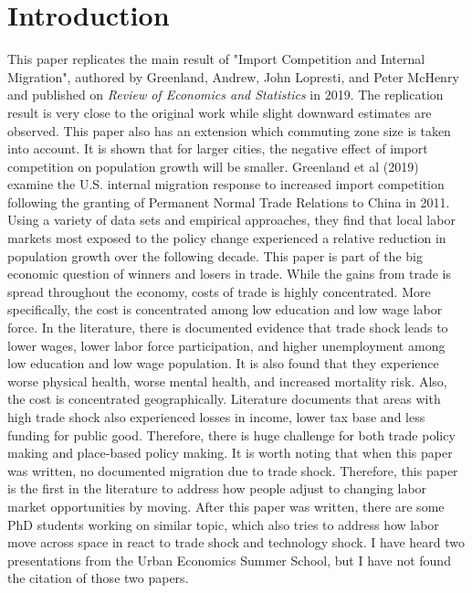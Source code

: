 \documentclass[12pt, final]{CSP}
\begin{document}
\section{Introduction}
\label{}
\noindent
This paper replicates the main result of "Import Competition and Internal Migration"\cite{greenland2019import}, authored by Greenland, Andrew, John Lopresti, and Peter McHenry and published on \textit{Review of Economics and Statistics} in 2019. The replication result is very close to the original work while slight downward estimates are observed. This paper also has an extension which commuting zone size is taken into account. It is shown that for larger cities, the negative effect of import competition on population growth will be smaller. 
\newline
\newline
Greenland et al (2019)\cite{greenland2019import} examine the U.S. internal migration response to increased import competition following the granting of Permanent Normal Trade Relations to China in 2011. Using a variety of data sets and empirical approaches, they find that local labor markets most exposed to the policy change experienced a relative reduction in population growth over the following decade.
\newline
\newline
This paper is part of the big economic question of winners and losers in trade. While the gains from trade is spread throughout the economy, costs of trade is highly concentrated. More specifically, the cost is concentrated among low education and low wage labor force. In the literature, there is documented evidence that trade shock leads to lower wages, lower labor force participation, and higher unemployment among low education and low wage population. It is also found that they experience worse physical health, worse mental health, and increased mortality risk. Also, the cost is concentrated geographically. Literature documents that areas with high trade shock also experienced losses in income, lower tax base and less funding for public good. Therefore, there is huge challenge for both trade policy making and place-based policy making.  
\newline
\newline
It is worth noting that when this paper was written, no documented migration due to trade shock. Therefore, this paper is the first in the literature to address how people adjust to changing labor market opportunities by moving. After this paper was written, there are some PhD students working on similar topic, which also tries to address how labor move across space in react to trade shock and technology shock. I have heard two presentations from the Urban Economics Summer School, but I have not found the citation of those two papers. 
\end{document}
